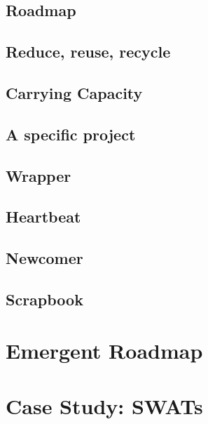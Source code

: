 \documentclass[nols,nobib]{tufte-book}
\begin{document}
\section{Roadmap} \label{sec:Roadmap}

%
\section{Reduce, reuse, recycle} \label{sec:Reduce, reuse, recycle}
 
%
\section{Carrying Capacity} \label{sec:Carrying capacity}

%
\section{A specific project} \label{sec:A specific project}

%
\section{Wrapper} \label{sec:Wrapper}

%
\section{Heartbeat} \label{sec:Heartbeat}

%
\section{Newcomer} \label{sec:Newcomer}

%
\section{Scrapbook} \label{sec:Scrapbook}


\chapter{Emergent Roadmap} \label{sec:Distributed_Roadmap}
 

\renewcommand*{\footnote}[1]{\oldfootnote{#1}}%
\renewcommand*{\textsuperscript}[1]{\oldtextsuperscript{#1}}%

\chapter{Case Study: SWATs} \label{swats}

\end{document}
